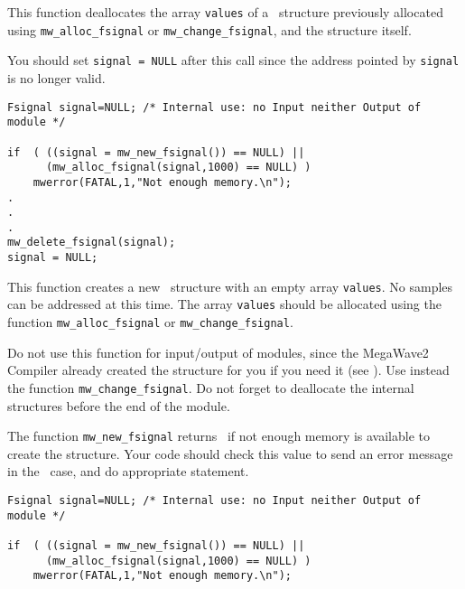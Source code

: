 \newpage %

\Description
This function deallocates the array \verb+values+ of a \fsignal\ structure previously allocated using \verb+mw_alloc_fsignal+ or \verb+mw_change_fsignal+, and the structure itself. 

You should set \verb+signal = NULL+ after this call since the address pointed
by \verb+signal+ is no longer valid.

\Next
\Example
\begin{verbatim}
Fsignal signal=NULL; /* Internal use: no Input neither Output of module */

if  ( ((signal = mw_new_fsignal()) == NULL) ||
      (mw_alloc_fsignal(signal,1000) == NULL) )
    mwerror(FATAL,1,"Not enough memory.\n");
.
.
.
mw_delete_fsignal(signal);
signal = NULL;

\end{verbatim}

\newpage %


\Description
This function creates a new \fsignal\ structure with an empty array \verb+values+.
No samples can be addressed at this time.
The array \verb+values+ should  be allocated using the function \verb+mw_alloc_fsignal+ or \verb+mw_change_fsignal+.

Do not use this function for input/output of modules, since the MegaWave2
Compiler already created the structure for you if you need it (see \volI). Use instead the function \verb+mw_change_fsignal+.
Do not forget to deallocate the internal structures before the end
of the module.

The function \verb+mw_new_fsignal+ returns \Null\ if not enough memory is available to create the structure. Your code should check this value to send an
error message in the \Null\ case, and do appropriate statement.

\Next
\Example
\begin{verbatim}
Fsignal signal=NULL; /* Internal use: no Input neither Output of module */

if  ( ((signal = mw_new_fsignal()) == NULL) ||
      (mw_alloc_fsignal(signal,1000) == NULL) )
    mwerror(FATAL,1,"Not enough memory.\n");
\end{verbatim}

\newpage %

